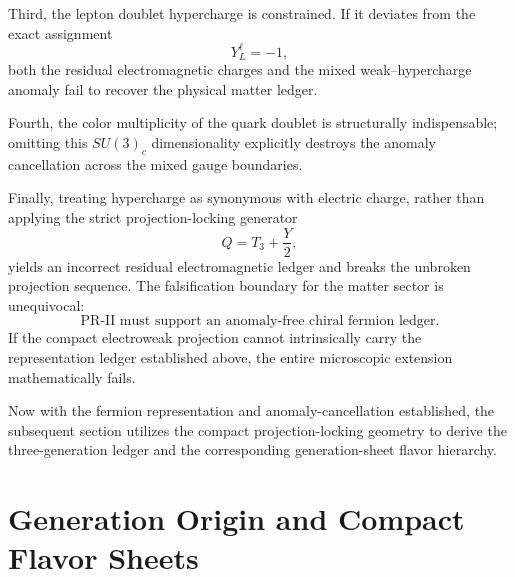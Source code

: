 \documentclass[11pt]{article}
\begin{document}
Third, the lepton doublet hypercharge is constrained. If it deviates from the exact assignment
\begin{equation}
Y_L^\ell=-1,
\end{equation}
both the residual electromagnetic charges and the mixed weak--hypercharge anomaly fail to recover the physical matter ledger. 

Fourth, the color multiplicity of the quark doublet is structurally indispensable; omitting this $SU(3)_c$ dimensionality explicitly destroys the anomaly cancellation across the mixed gauge boundaries.

Finally, treating hypercharge as synonymous with electric charge, rather than applying the strict projection-locking generator
\begin{equation}
Q=T_3+\frac{Y}{2},
\end{equation}
yields an incorrect residual electromagnetic ledger and breaks the unbroken projection sequence. The falsification boundary for the matter sector is unequivocal:
\begin{equation}
\boxed{
\text{PR-II must support an anomaly-free chiral fermion ledger.}
}
\end{equation}
If the compact electroweak projection cannot intrinsically carry the representation ledger established above, the entire microscopic extension mathematically fails.

Now with the fermion representation and anomaly-cancellation established, the subsequent section utilizes the compact projection-locking geometry to derive the three-generation ledger and the corresponding generation-sheet flavor hierarchy.

\section{Generation Origin and Compact Flavor Sheets}
\label{sec:pr2_generation_origin_flavor_sheets}
\end{document}
